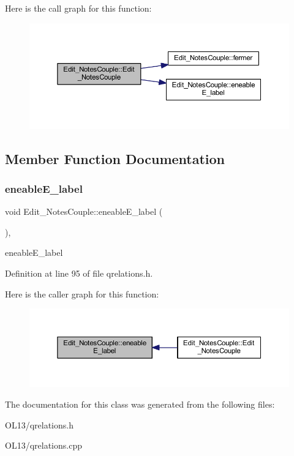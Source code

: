 Here is the call graph for this function\+:\nopagebreak
\begin{figure}[H]
\begin{center}
\leavevmode
\includegraphics[width=350pt]{class_edit___notes_couple_aa0780f3a53175747c5a7136d4f2ffa30_cgraph}
\end{center}
\end{figure}


\subsection{Member Function Documentation}
\mbox{\label{class_edit___notes_couple_ad51b47f9284bea44cddc186674c57bc9}} 
\subsubsection{\texorpdfstring{eneable\+E\+\_\+label}{eneableE\_label}}
{\footnotesize\ttfamily void Edit\+\_\+\+Notes\+Couple\+::eneable\+E\+\_\+label (\begin{DoxyParamCaption}{ }\end{DoxyParamCaption})\hspace{0.3cm}{\ttfamily [inline]}, {\ttfamily [slot]}}

eneable\+E\+\_\+label 

Definition at line 95 of file qrelations.\+h.

Here is the caller graph for this function\+:\nopagebreak
\begin{figure}[H]
\begin{center}
\leavevmode
\includegraphics[width=350pt]{class_edit___notes_couple_ad51b47f9284bea44cddc186674c57bc9_icgraph}
\end{center}
\end{figure}


The documentation for this class was generated from the following files\+:\begin{DoxyCompactItemize}
\item 
O\+L13/qrelations.\+h\item 
O\+L13/qrelations.\+cpp\end{DoxyCompactItemize}
